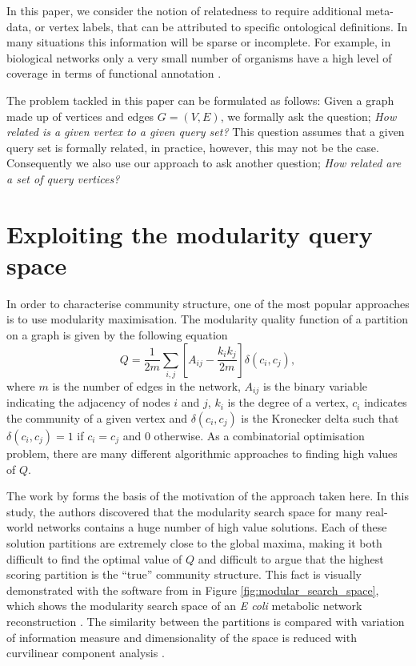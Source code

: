 \documentclass[a4paper,10pt]{article}
\begin{document}
In this paper, we consider the notion of relatedness to require additional meta-data, or vertex labels, that can be attributed to specific ontological definitions.
In many situations this information will be sparse or incomplete.
For example, in biological networks only a very small number of organisms have a high level of coverage in terms of functional annotation \cite{}.

The problem tackled in this paper can be formulated as follows:
Given a graph made up of vertices and edges $G = (V, E)$, we formally ask the question; \textit{How related is a given vertex to a given query set?}
This question assumes that a given query set is formally related, in practice, however, this may not be the case.
Consequently we also use our approach to ask another question; \textit{ How related are a set of query vertices?}


\section{Exploiting the modularity query space}
In order to characterise community structure, one of the most popular approaches is to use modularity maximisation.
The modularity quality function of a partition on a graph is given by the following equation \cite{newman2004}
\begin{equation}\label{eq:modularity}
  Q = \frac{1}{2m}\sum_{i,j} \left[A_{ij} - \frac{k_i k_j}{2m}\right]\delta(c_i, c_j),
\end{equation}
where $m$ is the number of edges in the network, $A_{ij}$ is the binary variable indicating the adjacency of nodes $i$ and $j$, $k_i$ is the degree of a vertex, $c_i$ indicates the community of a given vertex and $\delta(c_i, c_j)$ is the Kronecker delta such that $\delta(c_i, c_j) = 1$ if $c_i = c_j$ and $0$ otherwise.
As a combinatorial optimisation problem, there are many different algorithmic approaches to finding high values of $Q$.

The work by \cite{good2010performance} forms the basis of the motivation of the approach taken here.
In this study, the authors discovered that the modularity search space for many real-world networks contains a huge number of high value solutions.
Each of these solution partitions are extremely close to the global maxima, making it both difficult to find the optimal value of $Q$ and difficult to argue that the highest scoring partition is the ``true'' community structure.
This fact is visually demonstrated with the software from \cite{good2010performance} in Figure \ref{fig:modular_search_space}, which shows the modularity search space of an \textit{E coli} metabolic network reconstruction \cite{GuimeraNature2005}.
The similarity between the partitions is compared with variation of information measure \cite{meilua2003comparing} and dimensionality of the space is reduced with curvilinear component analysis \cite{demartines1997curvilinear}.
\end{document}
